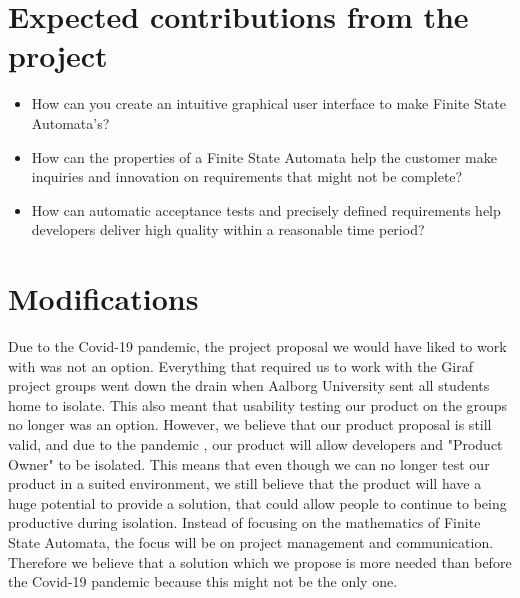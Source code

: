 \section{Expected contributions from the project}
\begin{itemize}
    \item How can you create an intuitive graphical user interface to make Finite State Automata's?
    \item How can the properties of a Finite State Automata help the customer make inquiries and innovation on requirements that might not be complete?
    \item How can automatic acceptance tests and precisely defined requirements help developers deliver high quality within a reasonable time period?
\end{itemize}

\section{Modifications}
Due to the Covid-19 pandemic, the project proposal we would have liked to work with was not an option.
Everything that required us to work with the Giraf project groups went down the drain when Aalborg University sent all students home to isolate.
This also meant that usability testing our product on the groups no longer was an option. 
However, we believe that our product proposal is still valid, and due to the pandemic , our product will allow developers and "Product Owner" to be isolated.
This means that even though we can no longer test our product in a suited environment, we still believe that the product will have a huge potential to provide a solution, that could allow people to continue to being productive during isolation.
Instead of focusing on the mathematics of Finite State Automata, the focus will be on project management and communication.
Therefore we believe that a solution which we propose is more needed than before the Covid-19 pandemic because this might not be the only one.
